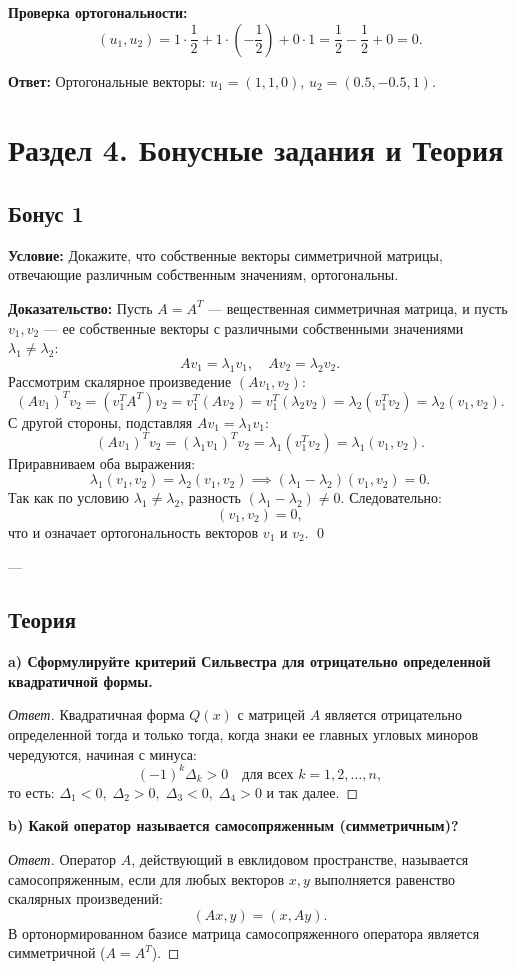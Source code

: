 \documentclass[11pt, a4paper]{article}
\begin{document}
\textbf{Проверка ортогональности:}
$$ (u_1, u_2) = 1 \cdot \frac{1}{2} + 1 \cdot \left(-\frac{1}{2}\right) + 0 \cdot 1 = \frac{1}{2} - \frac{1}{2} + 0 = 0. $$

\textbf{Ответ:} Ортогональные векторы: $u_1 = (1, 1, 0)$, $u_2 = (0.5, -0.5, 1)$.

\newpage

\section{Раздел 4. Бонусные задания и Теория}

\subsection*{Бонус 1}
\textbf{Условие:} Докажите, что собственные векторы симметричной матрицы, отвечающие различным собственным значениям, ортогональны.

\textbf{Доказательство:}
Пусть $A = A^T$ --- вещественная симметричная матрица, и пусть $v_1, v_2$ --- ее собственные векторы с различными собственными значениями $\lambda_1 \ne \lambda_2$:
$$ A v_1 = \lambda_1 v_1, \quad A v_2 = \lambda_2 v_2. $$
Рассмотрим скалярное произведение $(A v_1, v_2)$:
$$ (A v_1)^T v_2 = (v_1^T A^T) v_2 = v_1^T (A v_2) = v_1^T (\lambda_2 v_2) = \lambda_2 (v_1^T v_2) = \lambda_2 (v_1, v_2). $$
С другой стороны, подставляя $A v_1 = \lambda_1 v_1$:
$$ (A v_1)^T v_2 = (\lambda_1 v_1)^T v_2 = \lambda_1 (v_1^T v_2) = \lambda_1 (v_1, v_2). $$
Приравниваем оба выражения:
$$ \lambda_1 (v_1, v_2) = \lambda_2 (v_1, v_2) \implies (\lambda_1 - \lambda_2) (v_1, v_2) = 0. $$
Так как по условию $\lambda_1 \ne \lambda_2$, разность $(\lambda_1 - \lambda_2) \ne 0$. Следовательно:
$$ (v_1, v_2) = 0, $$
что и означает ортогональность векторов $v_1$ и $v_2$. \qed

---

\subsection*{Теория}

\textbf{a) Сформулируйте критерий Сильвестра для отрицательно определенной квадратичной формы.}
\begin{proof}[Ответ]
Квадратичная форма $Q(x)$ с матрицей $A$ является отрицательно определенной тогда и только тогда, когда знаки ее главных угловых миноров чередуются, начиная с минуса:
$$ (-1)^k \Delta_k > 0 \quad \text{для всех } k = 1, 2, \dots, n, $$
то есть: $\Delta_1 < 0, \; \Delta_2 > 0, \; \Delta_3 < 0, \; \Delta_4 > 0$ и так далее.
\end{proof}

\textbf{b) Какой оператор называется самосопряженным (симметричным)?}
\begin{proof}[Ответ]
Оператор $A$, действующий в евклидовом пространстве, называется самосопряженным, если для любых векторов $x, y$ выполняется равенство скалярных произведений:
$$ (A x, y) = (x, A y). $$
В ортонормированном базисе матрица самосопряженного оператора является симметричной ($A = A^T$).
\end{proof}
\end{document}
